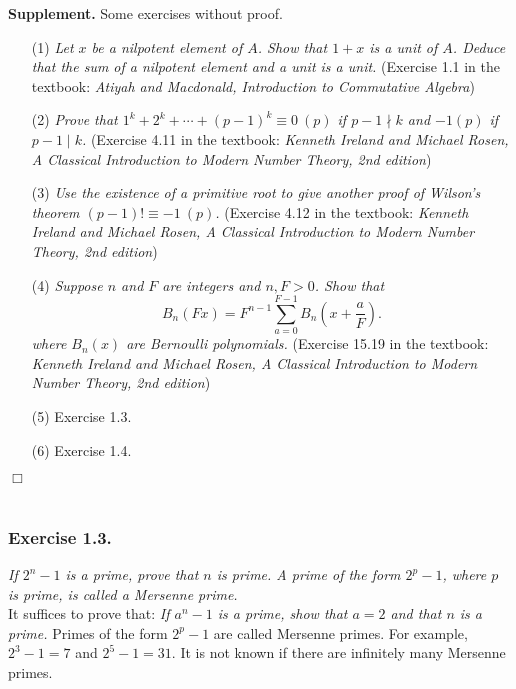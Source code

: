 \documentclass{article}
\begin{document}
\textbf{Supplement.} Some exercises without proof.
\begin{enumerate}
\item[(1)]
\emph{Let $x$ be a nilpotent element of $A$.
Show that $1+x$ is a unit of $A$.
Deduce that the sum of a nilpotent element and a unit is a unit.}
(Exercise 1.1 in the textbook: \emph{Atiyah and Macdonald,
Introduction to Commutative Algebra})

\item[(2)]
\emph{Prove that $1^k + 2^k + \cdots + (p-1)^k \equiv 0 \: (p)$
if $p - 1 \nmid k$ and $-1 (p)$ if $p - 1 \mid k$.}
(Exercise 4.11 in the textbook: \emph{Kenneth Ireland and Michael Rosen,
A Classical Introduction to Modern Number Theory, 2nd edition})

\item[(3)]
\emph{Use the existence of a primitive root to give another proof
of Wilson's theorem $(p - 1)! \equiv -1 \: (p)$.}
(Exercise 4.12 in the textbook: \emph{Kenneth Ireland and Michael Rosen,
A Classical Introduction to Modern Number Theory, 2nd edition})

\item[(4)]
\emph{Suppose $n$ and $F$ are integers and $n, F > 0$. Show that
$$B_n(Fx) = F^{n-1} \sum_{a=0}^{F-1} B_n \left(x + \frac{a}{F} \right).$$
where $B_n(x)$ are Bernoulli polynomials.}
(Exercise 15.19 in the textbook: \emph{Kenneth Ireland and Michael Rosen,
A Classical Introduction to Modern Number Theory, 2nd edition})

\item[(5)]
Exercise 1.3.

\item[(6)]
Exercise 1.4.
\end{enumerate}
$\Box$ \\\\





\subsubsection*{Exercise 1.3.}
\emph{If $2^n - 1$ is a prime, prove that $n$ is prime.
A prime of the form $2^p - 1$, where $p$ is prime, is called a Mersenne prime.} \\

It suffices to prove that:
\emph{If $a^n - 1$ is a prime, show that $a = 2$ and that $n$ is a prime.}
Primes of the form $2^p - 1$ are called Mersenne primes.
For example, $2^3 - 1 = 7$ and $2^5 - 1 = 31$.
It is not known if there are infinitely many Mersenne primes. \\
\end{document}
